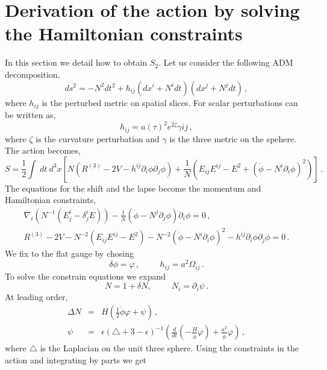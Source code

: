\documentclass[a4paper,11pt]{article}
\numberwithin{equation}{section}
\numberwithin{equation}{section}
\begin{document}
\section{Derivation of  the action by solving the Hamiltonian constraints}
\label{sec:ADMPert}
In this section we detail how to obtain $S_2$.
Let us consider the following ADM decomposition,
\begin{equation}
ds^2=-N^2dt^2+h_{ij}\left(dx^i+N^idt\right)\left(dx^j+N^jdt\right) \,,
\end{equation}
where $h_{ij}$ is the perturbed metric on spatial slices. For scalar perturbations can be written as,
\begin{equation}
h_{ij}=a(\tau)^2e^{2\zeta}\gamma{ij} \,,
\end{equation}
where $\zeta$ is the curvature perturbation and $\gamma$ is the three metric on the spehere. The action becomes,
\begin{equation}
S=\frac{1}{2}\int \ d t\ d^3x\left[N\left(R^{(3)}-2V-h^{ij}\partial_i\phi\partial_j\phi\right)+\frac{1}{N}\left(E_{ij}E^{ij}-E^2+(\dot\phi-N^i\partial_i\phi)^2\right)\right] \,.
\end{equation}
The equations for the shift and the lapse become the momentum and Hamiltonian constraints,
\begin{eqnarray}
\nabla_i\left(N^{-1}(E^i_j-\delta^i_j E)\right)-\frac{1}{N}\left(\dot\phi-N^j\partial_j\phi\right)\partial_i\phi=0 \,,\\
R^{(3)}-2V-N^{-2}(E_{ij}E^{ij}-E^2)-N^{-2}(\dot\phi-N^i\partial_i\phi)^2-h^{ij}\partial_i\phi\partial_j\phi=0 \,.
\end{eqnarray}
We fix to the flat gauge by chosing
\begin{equation}
\delta\phi=\varphi \,, \hspace{1cm} h_{ij}=a^2\Omega_{ij} \,.
\end{equation}
To solve the constrain equations we expand
\begin{equation}
N=1+\delta N,\hspace{1cm} N_i=\partial_i\psi \,.
\end{equation}
At leading order,
\begin{eqnarray}
\Delta N&=&H\left(\frac{1}{2}\dot\phi\varphi+\psi\right) \,,\\
\psi&=&\epsilon(\triangle+3-\epsilon)^{-1}\left(\frac{d}{dt}\left(-\frac{H}{\dot\phi}\varphi\right)+\frac{a^2}{\dot\phi}\varphi\right) \,,
\end{eqnarray}  
where $\triangle$ is the Laplacian on the unit three sphere. Using the constraints in the action and integrating by parts we get
\end{document}
